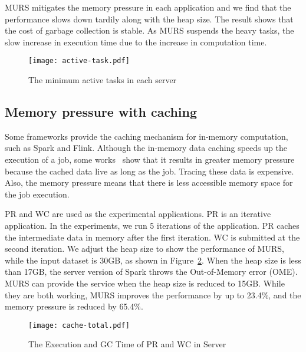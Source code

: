 MURS mitigates the memory pressure in each application and we find that the performance slows down tardily along with the heap size. The result shows that the cost of garbage collection is stable. As MURS suspends the heavy tasks, the slow increase in execution time due to the increase in computation time.  

\begin{figure}[!t]
\centering
\texttt{[image: active-task.pdf]}
\vspace{-2mm}
\caption{The minimum active tasks in each server}
\vspace{-4mm}
\label{fig:active-task}
\end{figure}

\subsection{Memory pressure with caching}

Some frameworks provide the caching mechanism for in-memory computation, such as Spark and Flink. Although the in-memory data caching speeds up the execution of a job, some works~\cite{bu:bloat, nguyen2015facade} show that it results in greater memory pressure because the cached data live as long as the job. Tracing these data is expensive. Also, the memory pressure means that there is less accessible memory space for the job execution.

PR and WC are used as the experimental applications. PR is an iterative application. In the experiments, we run 5 iterations of the application. PR caches the intermediate data in memory after the first iteration. WC is submitted at the second iteration. We adjust the heap size to show the performance of MURS, while the input dataset is 30GB, as shown in Figure~\ref{fig:cache-total}. When the heap size is less than 17GB, the server version of Spark throws the Out-of-Memory error (OME). MURS can provide the service when the heap size is reduced to 15GB. While they are both working, MURS improves the performance by up to 23.4\%, and the memory pressure is reduced by 65.4\%.

\begin{figure}[!t]
\centering
\texttt{[image: cache-total.pdf]}
\vspace{-2mm}
\caption{The Execution and GC Time of PR and WC in Server}
\vspace{-4mm}
\label{fig:cache-total}
\end{figure}


